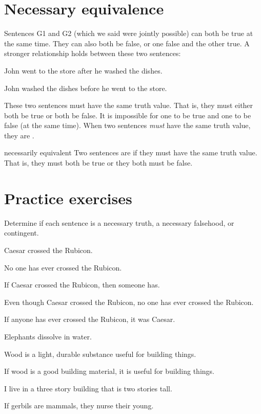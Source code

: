 \section{Necessary equivalence}

Sentences G1 and G2 (which we said were jointly possible) can both be true at the same time. They can also both be false, or one false and the other true. A stronger relationship holds between these two sentences:

\begin{earg}
\item[] John went to the store after he washed the dishes.
\item[] John washed the dishes before he went to the store.
\end{earg}
These two sentences must have the same truth value. That is, they must either both be true or both be false. It is impossible for one to be true and one to be false (at the same time).
When two sentences \textit{must} have the same truth value, they are .

\begin{factboxy}{necessarily equivalent}
Two sentences are  if they must have the same truth value. That is, they must both be true or they both must be false.
\end{factboxy}

 



\section{Practice exercises}
\setcounter{ProbPart}{0}

\problempart
\label{pr.EnglishTautology2}
Determine if each sentence is a necessary truth, a necessary falsehood, or contingent.
\begin{earg}
\item Caesar crossed the Rubicon.
\item No one has ever crossed the Rubicon.
\item If Caesar crossed the Rubicon, then someone has.
\item Even though Caesar crossed the Rubicon, no one has ever crossed the Rubicon.
\item If anyone has ever crossed the Rubicon, it was Caesar.

\item Elephants dissolve in water.
\item Wood is a light, durable substance useful for building things.
\item If wood is a good building material, it is useful for building things.
\item I live in a three story building that is two stories tall.
\item If gerbils are mammals, they nurse their young.
\end{earg}

